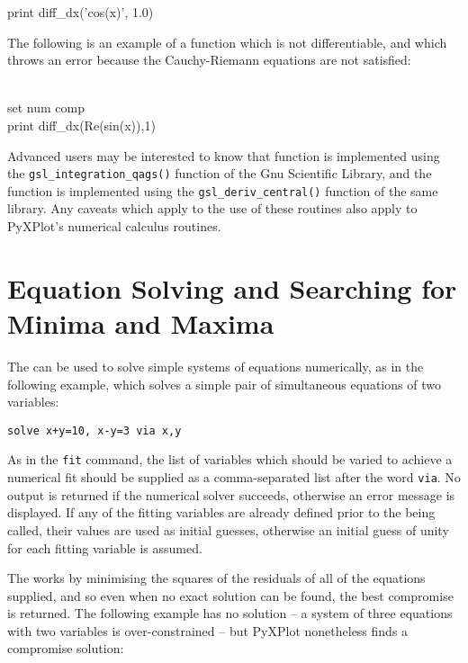 \begin{dodo}
print diff\_dx('cos(x)', 1.0)
\end{dodo}

The following is an example of a function which is not differentiable, and
which throws an error because the Cauchy-Riemann equations are not satisfied:

\begin{dontdo}\\
set num comp\\
print diff\_dx(Re(sin(x)),1)
\end{dontdo}

Advanced users may be interested to know that  function is
implemented using the {\tt gsl\_integration\_qags()} function of the Gnu
Scientific Library, and the  function is
implemented using the {\tt gsl\_deriv\_central()} function of the same library.
Any caveats which apply to the use of these routines also apply to PyXPlot's
numerical calculus routines.

\section{Equation Solving and Searching for Minima and Maxima}

The  can be used to solve simple systems of
equations numerically, as in the following example, which solves a simple pair of
simultaneous equations of two variables:

\begin{verbatim}
solve x+y=10, x-y=3 via x,y
\end{verbatim}

\noindent As in the {\tt fit} command, the list of variables which should be
varied to achieve a numerical fit should be supplied as a comma-separated list
after the word {\tt via}. No output is returned if the numerical solver
succeeds, otherwise an error message is displayed. If any of the fitting
variables are already defined prior to the  being called, their
values are used as initial guesses, otherwise an initial guess of unity for each
fitting variable is assumed.

The  works by minimising the squares of the residuals of all of the
equations supplied, and so even when no exact solution can be found, the best
compromise is returned. The following example has no solution -- a system of
three equations with two variables is over-constrained -- but PyXPlot
nonetheless finds a compromise solution:

